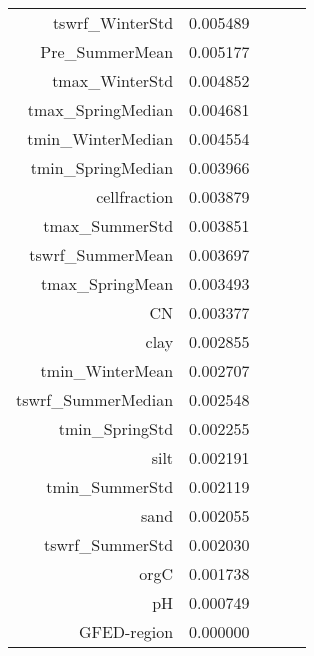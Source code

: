 \begin{tabular}{rrrrr}
tswrf_WinterStd & 0.005489 \\
Pre_SummerMean & 0.005177 \\
tmax_WinterStd & 0.004852 \\
tmax_SpringMedian & 0.004681 \\
tmin_WinterMedian & 0.004554 \\
tmin_SpringMedian & 0.003966 \\
cellfraction & 0.003879 \\
tmax_SummerStd & 0.003851 \\
tswrf_SummerMean & 0.003697 \\
tmax_SpringMean & 0.003493 \\
CN & 0.003377 \\
clay & 0.002855 \\
tmin_WinterMean & 0.002707 \\
tswrf_SummerMedian & 0.002548 \\
tmin_SpringStd & 0.002255 \\
silt & 0.002191 \\
tmin_SummerStd & 0.002119 \\
sand & 0.002055 \\
tswrf_SummerStd & 0.002030 \\
orgC & 0.001738 \\
pH & 0.000749 \\
GFED-region & 0.000000 \\
\bottomrule
\end{tabular}
